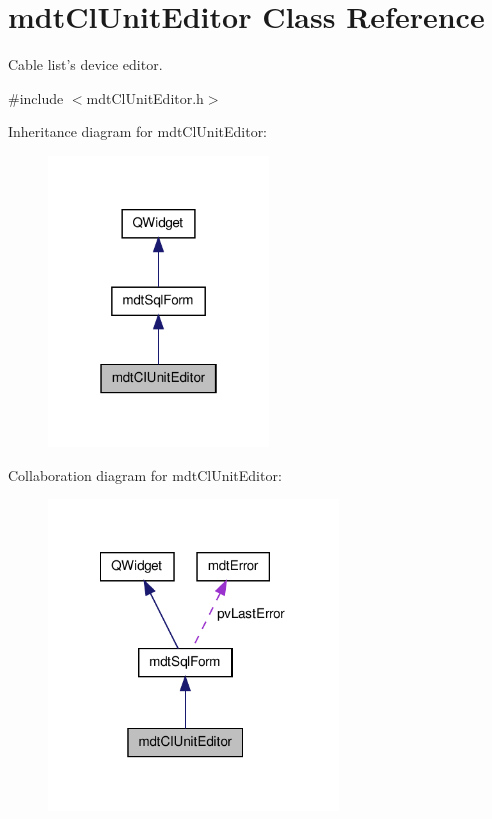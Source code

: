 \hypertarget{classmdt_cl_unit_editor}{\section{mdt\-Cl\-Unit\-Editor Class Reference}
\label{classmdt_cl_unit_editor}
}


Cable list's device editor.  




{\ttfamily \#include $<$mdt\-Cl\-Unit\-Editor.\-h$>$}



Inheritance diagram for mdt\-Cl\-Unit\-Editor\-:
\nopagebreak
\begin{figure}[H]
\begin{center}
\leavevmode
\includegraphics[width=166pt]{classmdt_cl_unit_editor__inherit__graph}
\end{center}
\end{figure}


Collaboration diagram for mdt\-Cl\-Unit\-Editor\-:
\nopagebreak
\begin{figure}[H]
\begin{center}
\leavevmode
\includegraphics[width=218pt]{classmdt_cl_unit_editor__coll__graph}
\end{center}
\end{figure}
